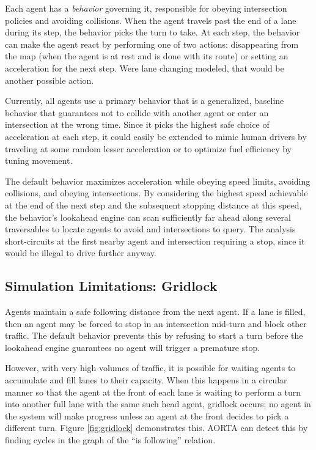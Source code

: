 \documentclass[letterpaper, 10 pt, conference]{ieeeconf}  %
\begin{document}
Each agent has a \emph{behavior} governing it, responsible for obeying
intersection policies and avoiding collisions. When the agent travels past the
end of a lane during its step, the behavior picks the turn to take. At each
step, the behavior can make the agent react by performing one of two actions:
disappearing from the map (when the agent is at rest and is done with its route)
or setting an acceleration for the next step. Were lane changing modeled, that
would be another possible action.

Currently, all agents use a primary behavior that is a generalized, baseline
behavior that guarantees not to collide with another agent or enter an
intersection at the wrong time. Since it picks the highest safe choice of
acceleration at each step, it could easily be extended to mimic human drivers by
traveling at some random lesser acceleration or to optimize fuel efficiency
by tuning movement.

The default behavior maximizes acceleration while obeying speed limits,
avoiding collisions, and obeying intersections. By considering the highest speed
achievable at the end of the next step and the subsequent stopping distance at
this speed, the behavior's lookahead engine can scan sufficiently far ahead
along several traversables to locate agents to avoid and intersections to query.
The analysis short-circuits at the first nearby agent and intersection requiring
a stop, since it would be illegal to drive further anyway.

\subsection{Simulation Limitations: Gridlock}

Agents maintain a safe following distance from the next agent. If a lane is
filled, then an agent may be forced to stop in an intersection mid-turn and
block other traffic. The default behavior prevents this by refusing to start a
turn before the lookahead engine guarantees no agent will trigger a premature
stop.

However, with very high volumes of traffic, it is possible for waiting agents to
accumulate and fill lanes to their capacity. When this happens in a circular
manner so that the agent at the front of each lane is waiting to perform a turn
into another full lane with the same such head agent, gridlock \cite{gridlock}
occurs; no agent in the system will make progress unless an agent at the front
decides to pick a different turn. Figure \ref{fig:gridlock} demonstrates this.
AORTA can detect this by finding cycles in the graph of the ``is following''
relation.
\end{document}
